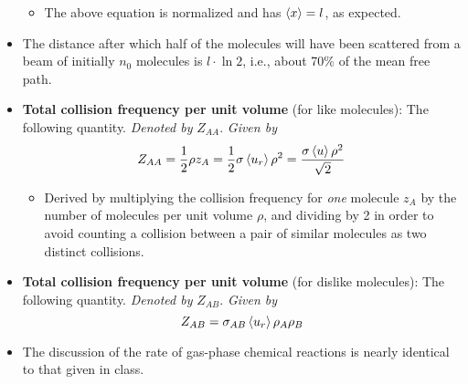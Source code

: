 \documentclass[../notes.tex]{subfiles}
\begin{document}
\begin{itemize}
\begin{itemize}
        \item The above equation is normalized and has $\left\langle{x}\right\rangle=l$, as expected.
    \end{itemize}
    \item The distance after which half of the molecules will have been scattered from a beam of initially $n_0$ molecules is $l\cdot\ln 2$, i.e., about 70\% of the mean free path.
    \item \textbf{Total collision frequency per unit volume} (for like molecules): The following quantity. \emph{Denoted by} $Z_{AA}$. \emph{Given by}
    \begin{equation*}
        Z_{AA} = \frac{1}{2}\rho z_A
        = \frac{1}{2}\sigma\left\langle{u_r}\right\rangle\rho^2
        = \frac{\sigma\left\langle{u}\right\rangle\rho^2}{\sqrt{2}}
    \end{equation*}
    \begin{itemize}
        \item Derived by multiplying the collision frequency for \emph{one} molecule $z_A$ by the number of molecules per unit volume $\rho$, and dividing by 2 in order to avoid counting a collision between a pair of similar molecules as two distinct collisions.
    \end{itemize}
    \item \textbf{Total collision frequency per unit volume} (for dislike molecules): The following quantity. \emph{Denoted by} $Z_{AB}$. \emph{Given by}
    \begin{equation*}
        Z_{AB} = \sigma_{AB}\left\langle{u_r}\right\rangle\rho_A\rho_B
    \end{equation*}
    \item The discussion of the rate of gas-phase chemical reactions is nearly identical to that given in class.
\end{itemize}
\end{document}
